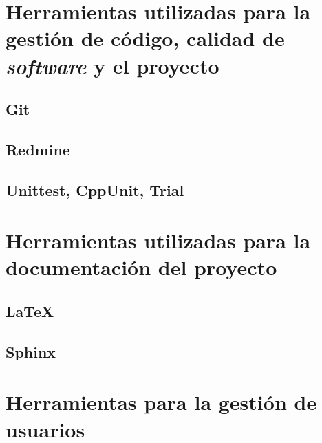 \section{Herramientas utilizadas para la gestión de código, calidad de \textit{software} y el proyecto}

\subsection{Git}

\subsection{Redmine}

\subsection{Unittest, CppUnit, Trial}

\section{Herramientas utilizadas para la documentación del proyecto}

\subsection{\LaTeX}

\subsection{Sphinx}

\section{Herramientas para la gestión de usuarios}

